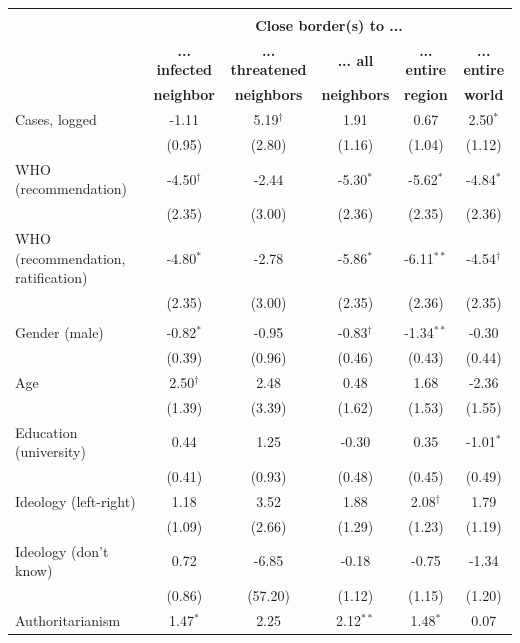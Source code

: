 \begin{table}[ht!]
\begin{center}
\footnotesize
\renewcommand{\arraystretch}{1.05}
\begin{tabular}{@{\extracolsep{4.8pt}}lccccc} 
\\[-1.8ex]\hline \\[-1.8ex]
 & \multicolumn{5}{c}{\normalsize{\textbf{Close border(s) to ...}}}
\\
  & \small{\textbf{... infected}} & \small{\textbf{... threatened}} & \small{\textbf{... all}} & \small{\textbf{... entire }} & \small{\textbf{... entire}}
 \\
  & \small{\textbf{neighbor}} & \small{\textbf{neighbors}} & \small{\textbf{neighbors}} & \small{\textbf{region}} & \small{\textbf{world}}
 \\
\hline
Cases, logged & -1.11 & 5.19$^{\dag}$ & 1.91 & 0.67 & 2.50$^{*}$\\
 & (0.95) & (2.80) & (1.16) & (1.04) & (1.12)\\
WHO (recommendation) & -4.50$^{\dag}$ & -2.44 & -5.30$^{*}$ & -5.62$^{*}$ & -4.84$^{*}$\\
 & (2.35) & (3.00) & (2.36) & (2.35) & (2.36)\\
WHO (recommendation, ratification) & -4.80$^{*}$ & -2.78 & -5.86$^{*}$ & -6.11$^{**}$ & -4.54$^{\dag}$\\
 & (2.35) & (3.00) & (2.35) & (2.36) & (2.35)\\
\\
Gender (male) & -0.82$^{*}$ & -0.95 & -0.83$^{\dag}$ & -1.34$^{**}$ & -0.30\\
 & (0.39) & (0.96) & (0.46) & (0.43) & (0.44)\\
Age & 2.50$^{\dag}$ & 2.48 & 0.48 & 1.68 & -2.36\\
 & (1.39) & (3.39) & (1.62) & (1.53) & (1.55)\\
Education (university) & 0.44 & 1.25 & -0.30 & 0.35 & -1.01$^{*}$\\
 & (0.41) & (0.93) & (0.48) & (0.45) & (0.49)\\
Ideology (left-right) & 1.18 & 3.52 & 1.88 & 2.08$^{\dag}$ & 1.79\\
 & (1.09) & (2.66) & (1.29) & (1.23) & (1.19)\\
Ideology (don't know) & 0.72 & -6.85 & -0.18 & -0.75 & -1.34\\
 & (0.86) & (57.20) & (1.12) & (1.15) & (1.20)\\
Authoritarianism & 1.47$^{*}$ & 2.25 & 2.12$^{**}$ & 1.48$^{*}$ & 0.07\\

\end{tabular}
\end{center}
\end{table}
